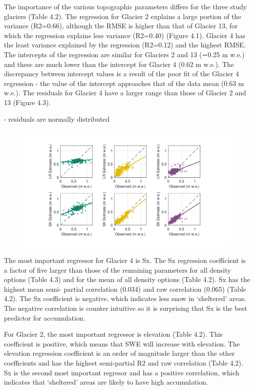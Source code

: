 \documentclass[twocolumn,letterpaper]{igs}
\begin{document}
The importance of the various topographic parameters differs for the three study glaciers (Table 4.2). The regression for Glacier 2 explains a large portion of the variance (R2=0.66), although the RMSE is higher than that of Glacier 13, for which the regression explains less variance (R2=0.40) (Figure 4.1). Glacier 4 has the least variance explained by the regression (R2=0.12) and the highest RMSE. The intercepts of the regression are similar for Glaciers 2 and 13 (∼0.25 m w.e.) and these are much lower than the intercept for Glacier 4 (0.62 m w.e.). The discrepancy between intercept values is a result of the poor fit of the Glacier 4 regression - the value of the intercept approaches that of the data mean (0.63 m w.e.). The residuals for Glacier 4 have a larger range than those of Glacier 2 and 13 (Figure 4.3).

- residuals are normally distributed

\begin{figure}
	\centering
	\includegraphics[width =\textwidth]{observedVSestimated_S2.pdf}\\
	\caption{}
	\label{fig:observedVSestimated_S2}
\end{figure}


The most important regressor for Glacier 4 is Sx. The Sx regression coefficient is a factor of five larger than those of the remaining parameters for all density options (Table 4.3) and for the mean of all density options (Table 4.2). Sx has the highest mean semi- partial correlation (0.034) and raw correlation (0.065) (Table 4.2). The Sx coefficient is negative, which indicates less snow in ‘sheltered’ areas. The negative correlation is counter intuitive so it is surprising that Sx is the best predictor for accumulation.

For Glacier 2, the most important regressor is elevation (Table 4.2). This coefficient is positive, which means that SWE will increase with elevation. The elevation regression coefficient is an order of magnitude larger than the other coefficients and has the highest semi-partial R2 and raw correlation (Table 4.2). Sx is the second most important regresor and has a positive correlation, which indicates that ‘sheltered’ areas are likely to have high accumulation.
\end{document}
